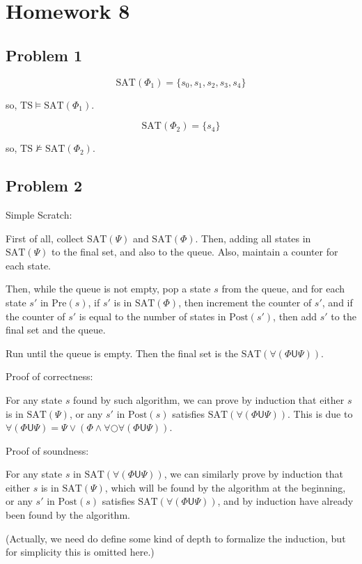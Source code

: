 \chapter{Homework 8}

\section{Problem 1}

$$
\text{SAT}({\Phi_1}) = \{s_0, s_1, s_2, s_3, s_4\}
$$

so, $\text{TS} \models \text{SAT}({\Phi_1})$.

$$
\text{SAT}({\Phi_2}) = \{s_4\}
$$

so, $\text{TS} \not \models \text{SAT}({\Phi_2})$.

\section{Problem 2}

Simple Scratch:

First of all, collect $\text{SAT}(\Psi)$ and $\text{SAT}(\Phi)$.
Then, adding all states in $\text{SAT}(\Psi)$ to the final set,
and also to the queue. Also, maintain a counter for each state.

Then, while the queue is not empty, pop a state $s$ from the queue,
and for each state $s'$ in $\text{Pre}(s)$, if $s'$ is in $\text{SAT}(\Phi)$, then
increment the counter of $s'$, and if the counter of $s'$ is equal to the number of
states in $\text{Post}(s')$, then add $s'$ to the final set and the queue.

Run until the queue is empty. Then the final set is the $\text{SAT}(\forall(\Phi \textsf{U} \Psi))$.

Proof of correctness:

For any state $s$ found by such algorithm, we can prove by induction that either $s$ is
in $\text{SAT}(\Psi)$, or any $s'$ in $\text{Post}(s)$ satisfies $\text{SAT}(\forall(\Phi \textsf{U} \Psi))$.
This is due to
$\forall(\Phi \textsf{U} \Psi) = \Psi \vee (\Phi \wedge \forall \bigcirc \forall(\Phi \textsf{U} \Psi))$.

Proof of soundness:

For any state $s$ in $\text{SAT}(\forall(\Phi \textsf{U} \Psi))$, we can similarly prove by induction that
either $s$ is in $\text{SAT}(\Psi)$, which will be found by the algorithm at the beginning, or
any $s'$ in $\text{Post}(s)$ satisfies $\text{SAT}(\forall(\Phi \textsf{U} \Psi))$, and by induction have
already been found by the algorithm.

(Actually, we need do define some kind of $\text{depth}$ to formalize the induction, but for simplicity
this is omitted here.)
